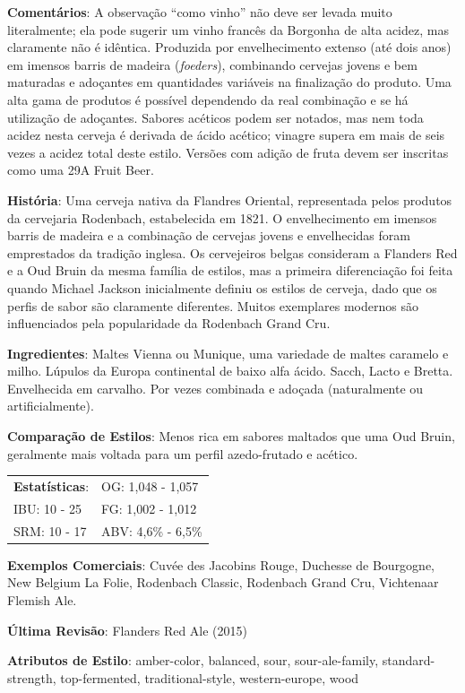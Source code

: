 \textbf{Comentários}: A observação “como vinho” não deve ser levada muito literalmente; ela pode sugerir um vinho francês da Borgonha de alta acidez, mas claramente não é idêntica. Produzida por envelhecimento extenso (até dois anos) em imensos barris de madeira (\textit{foeders}), combinando cervejas jovens e bem maturadas e adoçantes em quantidades variáveis na finalização do produto. Uma alta gama de produtos é possível dependendo da real combinação e se há utilização de adoçantes. Sabores acéticos podem ser notados, mas nem toda acidez nesta cerveja é derivada de ácido acético; vinagre supera em mais de seis vezes a acidez total deste estilo. Versões com adição de fruta devem ser inscritas como uma 29A Fruit Beer.

\textbf{História}: Uma cerveja nativa da Flandres Oriental, representada pelos produtos da cervejaria Rodenbach, estabelecida em 1821. O envelhecimento em imensos barris de madeira e a combinação de cervejas jovens e envelhecidas foram emprestados da tradição inglesa. Os cervejeiros belgas consideram a Flanders Red e a Oud Bruin da mesma família de estilos, mas a primeira diferenciação foi feita quando Michael Jackson inicialmente definiu os estilos de cerveja, dado que os perfis de sabor são claramente diferentes. Muitos exemplares modernos são influenciados pela popularidade da Rodenbach Grand Cru.

\textbf{Ingredientes}: Maltes Vienna ou Munique, uma variedade de maltes caramelo e milho. Lúpulos da Europa continental de baixo alfa ácido. Sacch, Lacto e Bretta. Envelhecida em carvalho. Por vezes combinada e adoçada (naturalmente ou artificialmente).

\textbf{Comparação de Estilos}: Menos rica em sabores maltados que uma Oud Bruin, geralmente mais voltada para um perfil azedo-frutado e acético.

\begin{tabular}{@{}p{35mm}p{35mm}@{}}
  \textbf{Estatísticas}: & OG: 1,048 - 1,057 \\
  IBU: 10 - 25  & FG: 1,002 - 1,012  \\
  SRM: 10 - 17  & ABV: 4,6\% - 6,5\%
\end{tabular}

\textbf{Exemplos Comerciais}: Cuvée des Jacobins Rouge, Duchesse de Bourgogne, New Belgium La Folie, Rodenbach Classic, Rodenbach Grand Cru, Vichtenaar Flemish Ale.

\textbf{Última Revisão}: Flanders Red Ale (2015)

\textbf{Atributos de Estilo}: amber-color, balanced, sour, sour-ale-family, standard-strength, top-fermented, traditional-style, western-europe, wood
